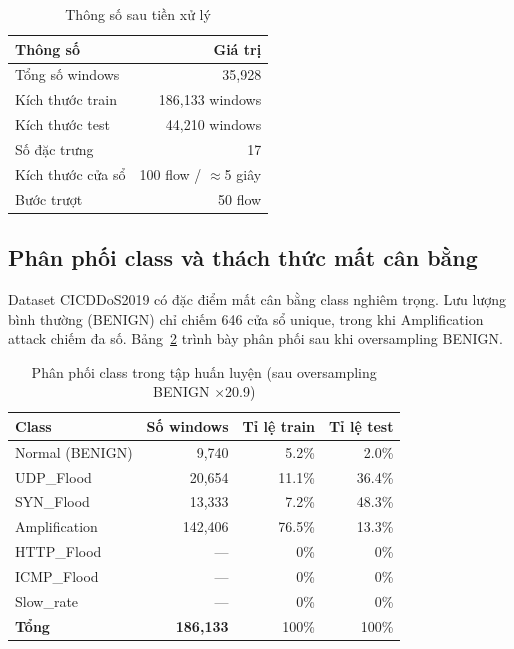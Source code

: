 \documentclass[12pt,a4paper]{article}
\begin{document}
\begin{table}[H]
\centering
\caption{Thông số sau tiền xử lý}
\label{tab:preprocess}
\begin{tabular}{lr}
\toprule
\textbf{Thông số} & \textbf{Giá trị} \\
\midrule
Tổng số windows      & 35,928 \\
Kích thước train     & 186,133 windows \\
Kích thước test      & 44,210 windows \\
Số đặc trưng         & 17 \\
Kích thước cửa sổ    & 100 flow / $\approx$5 giây \\
Bước trượt           & 50 flow \\
\bottomrule
\end{tabular}
\end{table}

\subsection{Phân phối class và thách thức mất cân bằng}

Dataset CICDDoS2019 có đặc điểm mất cân bằng class nghiêm trọng. Lưu lượng bình thường (BENIGN) chỉ chiếm 646 cửa sổ unique, trong khi Amplification attack chiếm đa số. Bảng~\ref{tab:class_dist} trình bày phân phối sau khi oversampling BENIGN.

\begin{table}[H]
\centering
\caption{Phân phối class trong tập huấn luyện (sau oversampling BENIGN $\times$20.9)}
\label{tab:class_dist}
\begin{tabular}{lrrr}
\toprule
\textbf{Class} & \textbf{Số windows} & \textbf{Tỉ lệ train} & \textbf{Tỉ lệ test} \\
\midrule
Normal (BENIGN)    & 9,740  & 5.2\%  & 2.0\% \\
UDP\_Flood         & 20,654 & 11.1\% & 36.4\% \\
SYN\_Flood         & 13,333 & 7.2\%  & 48.3\% \\
Amplification      & 142,406 & 76.5\% & 13.3\% \\
\midrule
HTTP\_Flood        & --- & 0\% & 0\% \\
ICMP\_Flood        & --- & 0\% & 0\% \\
Slow\_rate         & --- & 0\% & 0\% \\
\midrule
\textbf{Tổng}      & \textbf{186,133} & 100\% & 100\% \\
\bottomrule
\end{tabular}
\end{table}
\end{document}
